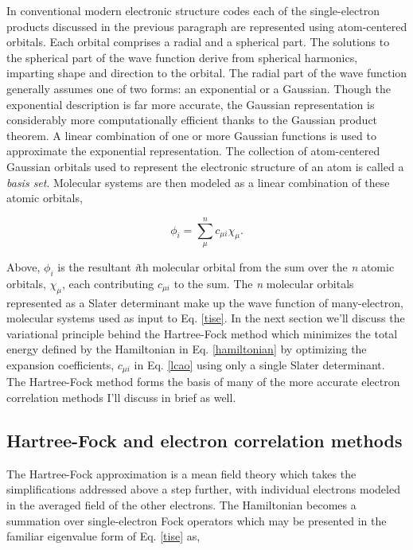 \begin{theory}
   In conventional modern electronic structure codes each of the single-electron products discussed in the previous paragraph 
   are represented using atom-centered orbitals. Each orbital comprises a radial and a spherical part. The solutions
   to the spherical part of the wave function derive from spherical harmonics, imparting shape and direction to the
   orbital. The radial part of the wave function generally assumes one of two forms: an exponential or a Gaussian.
   Though the exponential description is far more accurate, the Gaussian representation is considerably more 
   computationally efficient thanks to the Gaussian product theorem. A linear combination of one or more Gaussian 
   functions is used to approximate the exponential representation. The collection of atom-centered Gaussian orbitals
   used to represent the electronic structure of an atom is called a \emph{basis set}. Molecular systems are then
   modeled as a linear combination of these atomic orbitals,
   
   \begin{equation}\label{lcao}
    \phi_{i} = \sum_{\mu}^{n} c_{\mu i}\chi_{\mu}.
   \end{equation}   
   
   Above, $\phi_{i}$ is the resultant \emph{i}th molecular orbital from the sum over the \emph{n} atomic orbitals,
   $\chi_{\mu}$, each contributing $c_{\mu i}$ to the sum. The \emph{n} molecular orbitals represented as a 
   Slater determinant make up the wave function of many-electron, molecular systems used as input to Eq. \ref{tise}.
   In the next section we'll discuss the variational principle behind the Hartree-Fock method which minimizes the 
   total energy defined by the Hamiltonian in Eq. \ref{hamiltonian} by optimizing the expansion coefficients, 
   $c_{\mu i}$ in Eq. \ref{lcao} using only a single Slater determinant. The Hartree-Fock method forms the basis 
   of many of the more accurate electron correlation methods I'll discuss in brief as well.
   
  \subsection{\label{ch2:sec1:level3}Hartree-Fock and electron correlation methods}
  The Hartree-Fock approximation is a mean field theory which takes the simplifications addressed above a step
  further, with individual electrons modeled in the averaged field of the other electrons. The Hamiltonian
  becomes a summation over single-electron Fock operators which may be presented in the familiar eigenvalue 
  form of Eq. \ref{tise} as,
  

\end{theory}
